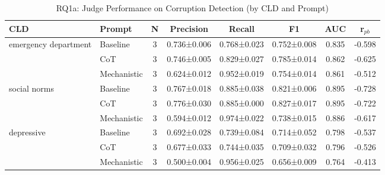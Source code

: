 \begin{table}[htbp]
\centreing
\caption{RQ1a: Judge Performance on Corruption Detection (by CLD and Prompt)}
\label{tab:rq1a_main}
\begin{tabular}{llcccccc}
\toprule
\textbf{CLD} & \textbf{Prompt} & \textbf{N} & \textbf{Precision} & \textbf{Recall} & \textbf{F1} & \textbf{AUC} & \textbf{r$_{pb}$} \\
\midrule
emergency department & Baseline & 3 & 0.736±0.006 & 0.768±0.023 & 0.752±0.008 & 0.835 & -0.598 \\
 & CoT & 3 & 0.746±0.005 & 0.829±0.027 & 0.785±0.014 & 0.862 & -0.625 \\
 & Mechanistic & 3 & 0.624±0.012 & 0.952±0.019 & 0.754±0.014 & 0.861 & -0.512 \\
\midrule
social norms & Baseline & 3 & 0.767±0.018 & 0.885±0.038 & 0.821±0.006 & 0.895 & -0.728 \\
 & CoT & 3 & 0.776±0.030 & 0.885±0.000 & 0.827±0.017 & 0.895 & -0.722 \\
 & Mechanistic & 3 & 0.594±0.012 & 0.974±0.022 & 0.738±0.015 & 0.886 & -0.617 \\
\midrule
depressive & Baseline & 3 & 0.692±0.028 & 0.739±0.084 & 0.714±0.052 & 0.798 & -0.537 \\
 & CoT & 3 & 0.677±0.033 & 0.744±0.035 & 0.709±0.032 & 0.796 & -0.526 \\
 & Mechanistic & 3 & 0.500±0.004 & 0.956±0.025 & 0.656±0.009 & 0.764 & -0.413 \\
\midrule
\bottomrule
\end{tabular}
\end{table}